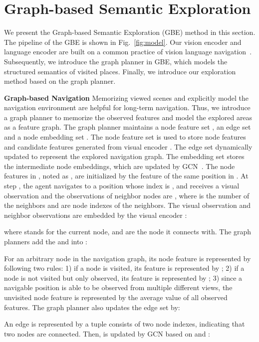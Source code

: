 \documentclass[final]{cvpr}
\begin{document}
\section{Graph-based Semantic Exploration}
\label{sec:GBE}
We present the Graph-based Semantic Exploration (GBE) method in this section. 
The pipeline of the GBE is shown in Fig.~\ref{fig:model}. 
Our vision encoder  and language encoder  are built on a common practice of vision language navigation~\cite{wang2018reinforced, tan2019learning, zhu2019vision}. 
Subsequently, we introduce the graph planner in GBE, which models the structured semantics of visited places. 
Finally, we introduce our exploration method based on the graph planner. 

\noindent\textbf{Graph-based Navigation}
Memorizing viewed scenes and explicitly model the navigation environment are helpful for long-term navigation. 
Thus, we introduce a graph planner to memorize the observed features and model the explored areas as a feature graph. 
The graph planner maintains a node feature set , an edge set  and a node embedding set . 
The node feature set  is used to store node features and candidate features generated from visual encoder . 
The edge set  dynamically updated to represent the explored navigation graph. 
The embedding set  stores the intermediate node embeddings, which are updated by GCN~\cite{kipf2016semi}. 
The node features in , noted as , are initialized by the feature of the same position in . 
At step , the agent navigates to a position whose index is , and receives a visual observation  and the observations of neighbor nodes are , 
where  is the number of the neighbors and  are node indexes of the neighbors. 
The visual observation and neighbor observations are embedded by the visual encoder : 

where  stands for the current node, and  are the node it connects with. 
The graph planners add the  and  into : 

For an arbitrary node  in the navigation graph, its node feature is represented by  following two rules: 
1) if a node  is visited, its feature  is represented by ; 
2) if a node  is not visited but only observed, its feature is represented by ; 
3) since a navigable position is able to be observed from multiple different views, the unvisited node feature is represented by the average value of all observed features. 
The graph planner also updates the edge set  by:

An edge is represented by a tuple consists of two node indexes, indicating that two nodes are connected. 
Then,  is updated by GCN based on  and : 
\end{document}
